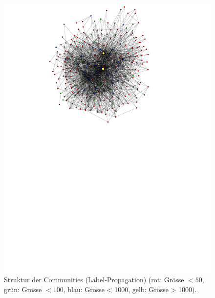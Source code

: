 \begin{figure}[h]
  \centering
  \includegraphics[scale=1.5]{images/label-prop-metagraph-20-narrow-cut.pdf}
  \caption{Struktur der Communities (Label-Propagation) (rot: Gr\"osse
    $<50$, gr\"un: Gr\"osse $<100$, blau: Gr\"osse < 1000, gelb:
    Gr\"osse > 1000).}
  \label{fig:metagraph-com-label}
\end{figure}




